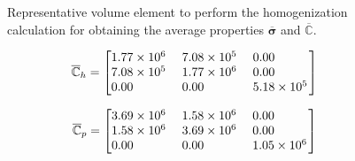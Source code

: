 \documentclass[preprint]{elsarticle}
\begin{document}
\begin{figure}[!ht]
\centering
{}
\caption{Representative volume element to perform the homogenization calculation for obtaining the 
average properties $\overline{\bm{\sigma}}$ and $\overline{\mathbb{C}}$.}
\label{fig_rve_front_fib}
\end{figure}

\begin{equation}
\overline{\mathbb{C}}_h = 
  \begin{bmatrix}
   \begin{tabular}{ @{}*{3}{S[round-mode=places,
                    round-integer-to-decimal,round-precision=2,
                    table-format=1.2e4,table-column-width=16mm,table-number-alignment=center]}@{}
		  }
    1.7722e+06 & 7.08e+05 & 0.0\\
    7.08e+05 & 1.77e+06 & 0.0\\
    0.0          & 0.0  & 5.18e+05
   \end{tabular}
  \end{bmatrix}
\end{equation}

\begin{equation}
\overline{\mathbb{C}}_p = 
  \begin{bmatrix}
   \begin{tabular}{ @{}*{3}{S[round-mode=places,
                    round-integer-to-decimal,round-precision=2,
                    table-format=1.2e4,table-column-width=16mm,table-number-alignment=center]}@{}
		  }
    3.691352e+06 & 1.582008e+06 & 0.0\\
    1.582008e+06 & 3.691352e+06 & 0.0\\
    0.0          & 0.0          & 1.054672e+06
   \end{tabular}
  \end{bmatrix}
\end{equation}
\end{document}
